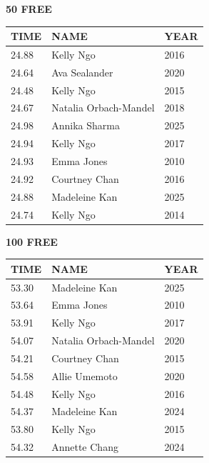 \begin{table}[H]
\centering
\begin{minipage}[t]{0.48\textwidth}
\centering
\textbf{50 FREE}\\[0.1cm]
\begin{tabular}{@{}p{1.8cm}p{2.8cm}p{1.2cm}@{}}
\hline
    \textbf{TIME} & \textbf{NAME} & \textbf{YEAR} \\
\hline
    24.88 & Kelly Ngo & 2016 \\
    24.64 & Ava Sealander & 2020 \\
    24.48 & Kelly Ngo & 2015 \\
    24.67 & Natalia Orbach-Mandel & 2018 \\
    24.98 & Annika Sharma & 2025 \\
    24.94 & Kelly Ngo & 2017 \\
    24.93 & Emma Jones & 2010 \\
    24.92 & Courtney Chan & 2016 \\
    24.88 & Madeleine Kan & 2025 \\
    24.74 & Kelly Ngo & 2014 \\
\hline
\end{tabular}
\end{minipage}\hfill
\begin{minipage}[t]{0.48\textwidth}
\centering
\textbf{100 FREE}\\[0.1cm]
\begin{tabular}{@{}p{1.8cm}p{2.8cm}p{1.2cm}@{}}
\hline
    \textbf{TIME} & \textbf{NAME} & \textbf{YEAR} \\
\hline
    53.30 & Madeleine Kan & 2025 \\
    53.64 & Emma Jones & 2010 \\
    53.91 & Kelly Ngo & 2017 \\
    54.07 & Natalia Orbach-Mandel & 2020 \\
    54.21 & Courtney Chan & 2015 \\
    54.58 & Allie Umemoto & 2020 \\
    54.48 & Kelly Ngo & 2016 \\
    54.37 & Madeleine Kan & 2024 \\
    53.80 & Kelly Ngo & 2015 \\
    54.32 & Annette Chang & 2024 \\
\hline
\end{tabular}
\end{minipage}
\end{table}

